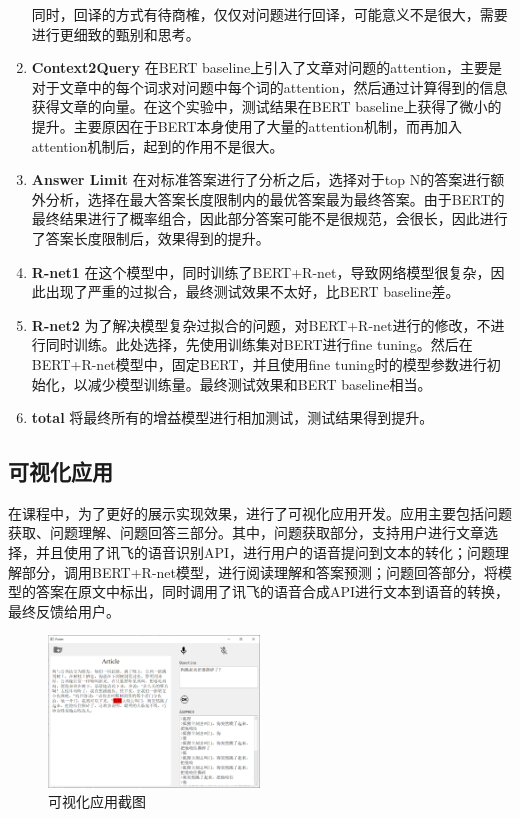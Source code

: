 \documentclass[10pt, a4]{extarticle}
\begin{document}
\begin{enumerate}
\begin{table}[H]
		\label{eda_result}
	\end{table}
	同时，回译的方式有待商榷，仅仅对问题进行回译，可能意义不是很大，需要进行更细致的甄别和思考。
	\item \textbf{Context2Query} 在BERT baseline上引入了文章对问题的attention，主要是对于文章中的每个词求对问题中每个词的attention，然后通过计算得到的信息获得文章的向量。在这个实验中，测试结果在BERT baseline上获得了微小的提升。主要原因在于BERT本身使用了大量的attention机制，而再加入attention机制后，起到的作用不是很大。
	\item \textbf{Answer Limit} 在对标准答案进行了分析之后，选择对于top N的答案进行额外分析，选择在最大答案长度限制内的最优答案最为最终答案。由于BERT的最终结果进行了概率组合，因此部分答案可能不是很规范，会很长，因此进行了答案长度限制后，效果得到的提升。
	\item \textbf{R-net1} 在这个模型中，同时训练了BERT+R-net，导致网络模型很复杂，因此出现了严重的过拟合，最终测试效果不太好，比BERT baseline差。
	\item \textbf{R-net2} 为了解决模型复杂过拟合的问题，对BERT+R-net进行的修改，不进行同时训练。此处选择，先使用训练集对BERT进行fine tuning。然后在BERT+R-net模型中，固定BERT，并且使用fine tuning时的模型参数进行初始化，以减少模型训练量。最终测试效果和BERT baseline相当。
	\item \textbf{total} 将最终所有的增益模型进行相加测试，测试结果得到提升。
\end{enumerate}

\subsection{可视化应用}
在课程中，为了更好的展示实现效果，进行了可视化应用开发。应用主要包括问题获取、问题理解、问题回答三部分。其中，问题获取部分，支持用户进行文章选择，并且使用了讯飞的语音识别API，进行用户的语音提问到文本的转化；问题理解部分，调用BERT+R-net模型，进行阅读理解和答案预测；问题回答部分，将模型的答案在原文中标出，同时调用了讯飞的语音合成API进行文本到语音的转换，最终反馈给用户。
\begin{figure}[H]
	\centering
	\includegraphics[width=0.5\textwidth]{figure/visual.png}
	\caption{可视化应用截图}
	\label{visual}
\end{figure}
\end{document}

